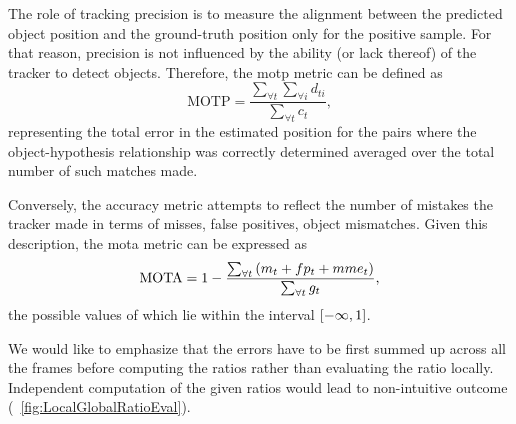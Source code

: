 The role of tracking precision is to measure the alignment between the predicted object position and the ground-truth position only for the positive sample. For that reason, precision is not influenced by the ability (or lack thereof) of the tracker to detect objects. Therefore, the \gls{motp} metric can be defined as
\begin{equation}
    \label{eq:MOTPMetric}
    \text{MOTP} = \frac{\sum_{\forall t} \sum_{\forall i} d_{ti}}{\sum_{\forall t} c_t},
\end{equation}
representing the total error in the estimated position for the pairs where the object-hypothesis relationship was correctly determined averaged over the total number of such matches made.

Conversely, the accuracy metric attempts to reflect the number of mistakes the tracker made in terms of misses, false positives, object mismatches. Given this description, the \gls{mota} metric can be expressed as
\begin{equation}
    \label{eq:MOTAMetric}
    \text{MOTA} = 1 - \frac{\sum_{\forall t} \left( {m_t + fp_t + mme_t} \right)}{\sum_{\forall t} g_t},
\end{equation}
the possible values of which lie within the interval $\left[ {-\infty, 1} \right]$.

We would like to emphasize that the errors have to be first summed up across all the frames before computing the ratios rather than evaluating the ratio locally. Independent computation of the given ratios would lead to non-intuitive outcome (\figtext{}~\ref{fig:LocalGlobalRatioEval}).

